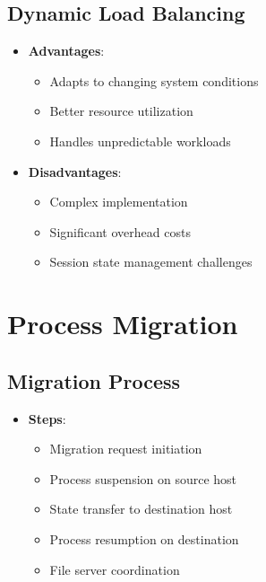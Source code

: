 \documentclass[12pt]{article}
\begin{document}
\subsection{Dynamic Load Balancing}
\begin{itemize}
  \item \textbf{Advantages}:
        \begin{itemize}
          \item Adapts to changing system conditions
          \item Better resource utilization
          \item Handles unpredictable workloads
        \end{itemize}

  \item \textbf{Disadvantages}:
        \begin{itemize}
          \item Complex implementation
          \item Significant overhead costs
          \item Session state management challenges
        \end{itemize}
\end{itemize}

\section{Process Migration}

\subsection{Migration Process}
\begin{itemize}
  \item \textbf{Steps}:
        \begin{itemize}
          \item Migration request initiation
          \item Process suspension on source host
          \item State transfer to destination host
          \item Process resumption on destination
          \item File server coordination
        \end{itemize}
\end{itemize}
\end{document}
